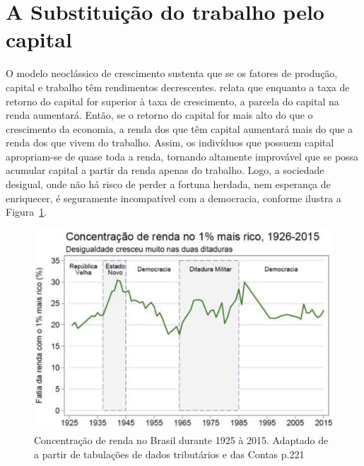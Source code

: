 \section{A Substituição do trabalho pelo capital}

O modelo neoclássico de crescimento sustenta que se os fatores de produção, capital e trabalho têm rendimentos decrescentes.
 relata que enquanto a taxa de retorno do capital for superior à taxa de crescimento, a parcela do capital na renda aumentará.
Então, se o retorno do capital for mais alto do que o crescimento da economia, a renda dos que têm capital aumentará mais do que a renda dos que vivem do trabalho.
Assim, os indivíduos que possuem capital apropriam-se de quase toda a renda, tornando altamente improvável que se possa acumular capital a partir da renda apenas do trabalho.
Logo, a sociedade desigual, onde não há risco de perder a fortuna herdada, nem esperança de enriquecer, é seguramente incompatível com a democracia, conforme ilustra a Figura~\ref{fig:concentracao-renda}. 


\begin{figure}[!ht]
    \centering
    \includegraphics[width=.7\linewidth]{img/concentracao-renda.png}
    \caption{Concentração de renda no Brasil durante 1925 à 2015.
    Adaptado de  a partir de tabulações de dados tributários e das Contas p.221}
    \label{fig:concentracao-renda}
\end{figure}
